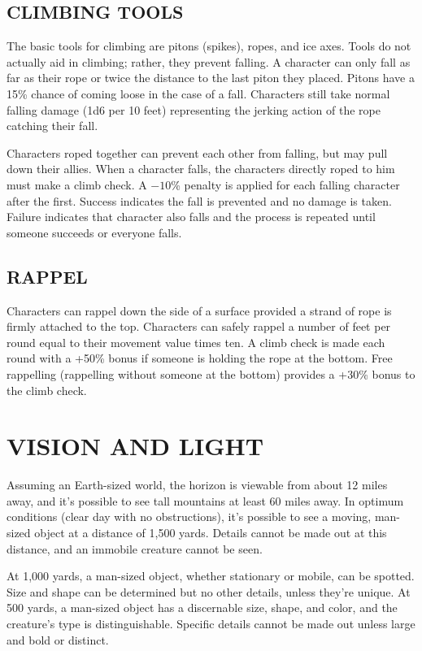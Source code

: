 \begin{multicols}{2}
\begin{minipage}{\columnwidth}
\end{minipage}

\subsection{CLIMBING TOOLS}
The basic tools for climbing are pitons (spikes), ropes, and ice axes.  Tools do not actually aid in climbing; rather, they prevent falling.  A character can only fall as far as their rope or twice the distance to the last piton they placed.  Pitons have a 15\% chance of coming loose in the case of a fall.  Characters still take normal falling damage (1d6 per 10 feet) representing the jerking action of the rope catching their fall.

Characters roped together can prevent each other from falling, but may pull down their allies.  When a character falls, the characters directly roped to him must make a climb check.  A $-10$\% penalty is applied for each falling character after the first.  Success indicates the fall is prevented and no damage is taken.  Failure indicates that character also falls and the process is repeated until someone succeeds or everyone falls.

\subsection{RAPPEL}
Characters can rappel down the side of a surface provided a strand of rope is firmly attached to the top.  Characters can safely rappel a number of feet per round equal to their movement value times ten.  A climb check is made each round with a +50\% bonus if someone is holding the rope at the bottom.  Free rappelling (rappelling without someone at the bottom) provides a +30\% bonus to the climb check.

\section{VISION AND LIGHT}

Assuming an Earth-sized world, the horizon is viewable from about 12 miles away, and it's possible to see tall mountains at least 60 miles away.  In optimum conditions (clear day with no obstructions), it's possible to see a moving, man-sized object at a distance of 1,500 yards.  Details cannot be made out at this distance, and an immobile creature cannot be seen.

At 1,000 yards, a man-sized object, whether stationary or mobile, can be spotted.  Size and shape can be determined but no other details, unless they're unique.  At 500 yards, a man-sized object has a discernable size, shape, and color, and the creature's type is distinguishable.  Specific details cannot be made out unless large and bold or distinct.


\end{multicols}
